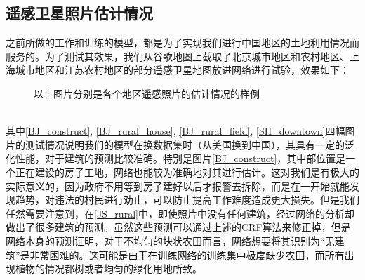 \documentclass[a4paper,12pt]{article}
\begin{document}
\begin{CJK*}{UTF8}{gbsn}
\begin{spacing}{1.2}
    \subsection{遥感卫星照片估计情况}
    之前所做的工作和训练的模型，都是为了实现我们进行中国地区的土地利用情况而服务的。为了测试其效果，我们从谷歌地图上\cite{}截取了北京城市地区和农村地区、上海城市地区和江苏农村地区的部分遥感卫星地图放进网络进行试验，效果如下：
    \begin{figure}
        \centering
        \hspace{1in}
        \hspace{1in}
        \hspace{1in}
        \hspace{1in}
        \caption{以上图片分别是各个地区遥感照片的估计情况的样例}
        \label{pics} %
    \end{figure}\\
    其中\ref{BJ_construct}, \ref{BJ_rural_house}, \ref{BJ_rural_field}, \ref{SH_downtown}四幅图片的测试情况说明我们的模型在换数据集时（从美国换到中国），其具有一定的泛化性能，对于建筑的预测比较准确。特别是图片\ref{BJ_construct}，其中部位置是一个正在建设的房子工地，网络也能较为准确地对其进行估计。这对我们是有极大的实际意义的，因为政府不用等到房子建好以后才报警去拆除，而是在一开始就能发现趋势，对违法的村民进行劝止，可以防止提高工作难度造成更大损失。但是我们任然需要注意到，在\ref{JS_rural}中，即使照片中没有任何建筑，经过网络的分析却做出了很多建筑的预测。虽然这些预测可以通过上述的CRF算法来修正掉，但是网络本身的预测证明，对于不均匀的块状农田而言，网络想要将其识别为“无建筑”是非常困难的。这可能是由于在训练网络的训练集中极度缺少农田，而所有出现植物的情况都树或者均匀的绿化用地所致。


\end{spacing}
\end{CJK*}
\end{document}
